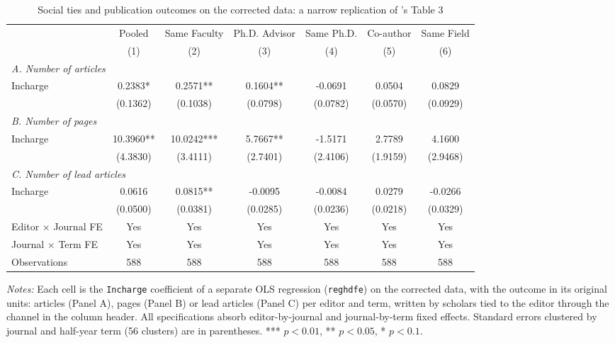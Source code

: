 \begin{table}[!htbp]
\renewcommand{\arraystretch}{1.0}
\centering
{}
\caption{Social ties and publication outcomes on the corrected data: a narrow replication of \citeauthor{Colussi2018}'s \citeyearpar[p. 49]{Colussi2018} Table 3}
\label{tab:table3_reghdfe_extended}
\small
\setlength{\tabcolsep}{3pt}
\begin{tabular}{lcccccc}
\toprule
 & Pooled & Same Faculty & Ph.D. Advisor & Same Ph.D. & Co-author & Same Field \\
 & (1) & (2) & (3) & (4) & (5) & (6) \\
\midrule
\multicolumn{7}{l}{\textit{A. Number of articles}} \\[2pt]
\quad Incharge & 0.2383* & 0.2571** & 0.1604** & -0.0691 & 0.0504 & 0.0829 \\
 & (0.1362) & (0.1038) & (0.0798) & (0.0782) & (0.0570) & (0.0929) \\[3pt]
\multicolumn{7}{l}{\textit{B. Number of pages}} \\[2pt]
\quad Incharge & 10.3960** & 10.0242*** & 5.7667** & -1.5171 & 2.7789 & 4.1600 \\
 & (4.3830) & (3.4111) & (2.7401) & (2.4106) & (1.9159) & (2.9468) \\[3pt]
\multicolumn{7}{l}{\textit{C. Number of lead articles}} \\[2pt]
\quad Incharge & 0.0616 & 0.0815** & -0.0095 & -0.0084 & 0.0279 & -0.0266 \\
 & (0.0500) & (0.0381) & (0.0285) & (0.0236) & (0.0218) & (0.0329) \\
\midrule
Editor $\times$ Journal FE & Yes & Yes & Yes & Yes & Yes & Yes \\
Journal $\times$ Term FE & Yes & Yes & Yes & Yes & Yes & Yes \\
Observations & 588 & 588 & 588 & 588 & 588 & 588 \\
\bottomrule
\end{tabular}
\begin{minipage}{\linewidth}
\vspace{4pt}
\footnotesize\textit{Notes:} Each cell is the \texttt{Incharge} coefficient of a separate OLS regression (\texttt{reghdfe}) on the corrected data, with the outcome in its original units: articles (Panel A), pages (Panel B) or lead articles (Panel C) per editor and term, written by scholars tied to the editor through the channel in the column header. All specifications absorb editor-by-journal and journal-by-term fixed effects. Standard errors clustered by journal and half-year term (56 clusters) are in parentheses. *** $p<0.01$, ** $p<0.05$, * $p<0.1$.
\end{minipage}
\end{table}
